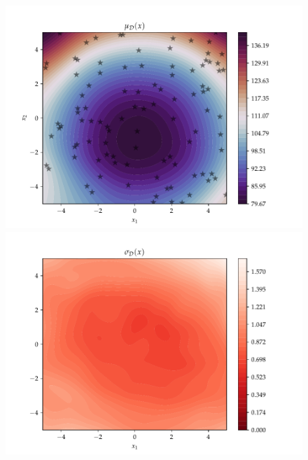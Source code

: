 \begin{figure}[h]
  \centering
  \begin{minipage}[b]{0.49\textwidth}
   \includegraphics[trim=1.2cm 0.7cm 2cm 1cm,clip,width=\textwidth]{Figures/coco_reg/f1_BOHAMIANN2.pdf}
  \end{minipage}
  \hfill
  \begin{minipage}[b]{0.49\textwidth}
    \includegraphics[trim=1.2cm 0.7cm 2cm 1cm,clip,width=\textwidth]{Figures/coco_reg/f1_BOHAMIANN3.pdf}
   \end{minipage}
  

\end{figure}
